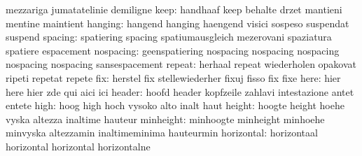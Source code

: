                            mezzariga                 jumatatelinie
                           demiligne
                     keep: handhaaf                  keep
                           behalte                   drzet
                           mantieni                  mentine
                           maintient
                  hanging: hangend                   hanging
                           haengend                  visici
                           sospeso                   suspendat
                           suspend
                  spacing: spatiering                spacing
                           spatiumausgleich          mezerovani
                           spaziatura                spatiere
                           espacement
                nospacing: geenspatiering            nospacing
                           nospacing                 nospacing
                           nospacing                 nospacing
                           sansespacement
                   repeat: herhaal                   repeat
                           wiederholen               opakovat
                           ripeti                    repetat
                           repete
                      fix: herstel                   fix
                           stellewiederher           fixuj
                           fisso                     fix
                           fixe
                     here: hier                      here
                           hier                      zde
                           qui                       aici
                           ici
                   header: hoofd                     header
                           kopfzeile                 zahlavi
                           intestazione              antet
                           entete
                     high: hoog                      high
                           hoch                      vysoko
                           alto                      inalt
                           haut
                   height: hoogte                    height
                           hoehe                     vyska
                           altezza                   inaltime
                           hauteur
                minheight: minhoogte                 minheight
                           minhoehe                  minvyska
                           altezzamin                inaltimeminima
                           hauteurmin
               horizontal: horizontaal               horizontal
                           horizontal                horizontalne
